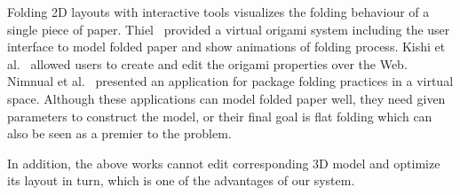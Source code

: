 Folding 2D layouts with interactive tools visualizes the folding behaviour of a single piece of paper. Thiel~\cite{Thiel1998} provided a virtual origami system including the user interface to model folded paper and show animations of folding process. Kishi et al.~\cite{Kishi:1998:OFP:786112.786279} allowed users to create and edit the origami properties over the Web. Nimnual et al.~\cite{Nimnual2007Virtual} presented an application for package folding practices in a virtual space. Although these applications can model folded paper well, they need given parameters to construct the model, or their final goal is flat folding which can also be seen as a premier to the problem.

In addition, the above works cannot edit corresponding 3D model and optimize its layout in turn, which is one of the advantages of our system.

